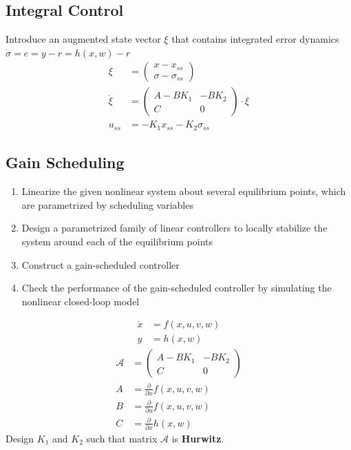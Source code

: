 \subsection{Integral Control}
Introduce an augmented state vector $\xi$ that contains integrated error dynamics $\Dot{\sigma} = e = y-r = h(x,w)-r$
\begin{align*}
    \xi       & = \begin{pmatrix}
                      x - x_{ss} \\
                      \sigma - \sigma_{ss}
                  \end{pmatrix}           \\
    \Dot{\xi} & = \begin{pmatrix}
                      A-BK_1 & -BK_2 \\
                      C      & 0
                  \end{pmatrix} \cdot \xi       \\
    u_{ss}    & = -K_1 x_{ss} - K_2 \sigma_{ss}
\end{align*}
\subsection{Gain Scheduling}
\begin{enumerate}
    \item Linearize the given nonlinear system about several equilibrium points, which are parametrized by scheduling variables
    \item Design a parametrized family of linear controllers to locally stabilize the system around each of the equilibrium points
    \item Construct a gain-scheduled controller
    \item Check the performance of the gain-scheduled controller by simulating the nonlinear closed-loop model
\end{enumerate}
\begin{align*}
    \Dot{x} & = f(x,u,v,w) \\
    y       & = h(x,w)
\end{align*}
\begin{align*}
    \mathcal{A} & = \begin{pmatrix}
                        A-BK_1 & -BK_2 \\
                        C      & 0
                    \end{pmatrix}                        \\
    A           & = \frac{\partial}{\partial x}f(x,u,v,w) \\
    B           & = \frac{\partial}{\partial u}f(x,u,v,w) \\
    C           & = \frac{\partial}{\partial x}h(x,w)
\end{align*}
Design $K_1$ and $K_2$ such that matrix $\mathcal{A}$ is \textbf{Hurwitz}.

